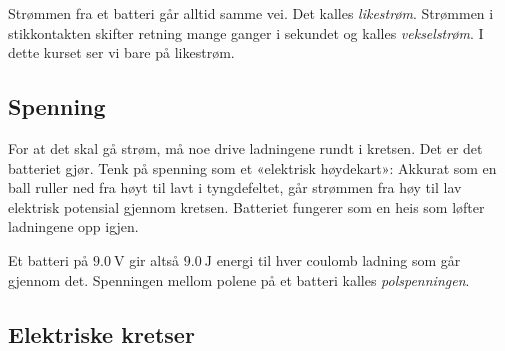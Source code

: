 Strømmen fra et batteri går alltid samme vei. Det kalles \emph{likestrøm}. Strømmen i stikkontakten skifter retning mange ganger i sekundet og kalles \emph{vekselstrøm}. I dette kurset ser vi bare på likestrøm.

\subsection*{Spenning}

For at det skal gå strøm, må noe drive ladningene rundt i kretsen. Det er det batteriet gjør. Tenk på spenning som et «elektrisk høydekart»: Akkurat som en ball ruller ned fra høyt til lavt i tyngdefeltet, går strømmen fra høy til lav elektrisk potensial gjennom kretsen. Batteriet fungerer som en heis som løfter ladningene opp igjen.


Et batteri på $\SI{9.0}{\volt}$ gir altså $\SI{9.0}{\joule}$ energi til hver coulomb ladning som går gjennom det. Spenningen mellom polene på et batteri kalles \emph{polspenningen}.



\subsection*{Elektriske kretser}

